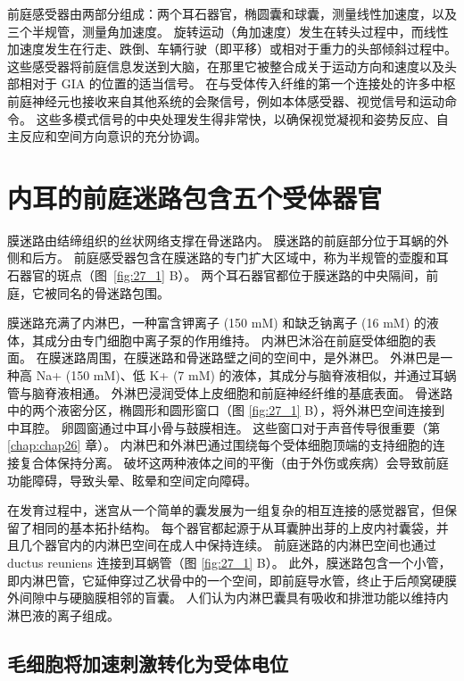 前庭感受器由两部分组成：两个耳石器官，椭圆囊和球囊，测量线性加速度，以及三个半规管，测量角加速度。
旋转运动（角加速度）发生在转头过程中，而线性加速度发生在行走、跌倒、车辆行驶（即平移）或相对于重力的头部倾斜过程中。
这些感受器将前庭信息发送到大脑，在那里它被整合成关于运动方向和速度以及头部相对于 GIA 的位置的适当信号。
在与受体传入纤维的第一个连接处的许多中枢前庭神经元也接收来自其他系统的会聚信号，例如本体感受器、视觉信号和运动命令。
这些多模式信号的中央处理发生得非常快，以确保视觉凝视和姿势反应、自主反应和空间方向意识的充分协调。



\section{内耳的前庭迷路包含五个受体器官}

膜迷路由结缔组织的丝状网络支撑在骨迷路内。
膜迷路的前庭部分位于耳蜗的外侧和后方。
前庭感受器包含在膜迷路的专门扩大区域中，称为半规管的壶腹和耳石器官的斑点（图~\ref{fig:27_1} B）。
两个耳石器官都位于膜迷路的中央隔间，前庭，它被同名的骨迷路包围。


膜迷路充满了内淋巴，一种富含钾离子 (150 mM) 和缺乏钠离子 (16 mM) 的液体，其成分由专门细胞中离子泵的作用维持。
内淋巴沐浴在前庭受体细胞的表面。
在膜迷路周围，在膜迷路和骨迷路壁之间的空间中，是外淋巴。
外淋巴是一种高 Na+ (150 mM)、低 K+ (7 mM) 的液体，其成分与脑脊液相似，并通过耳蜗管与脑脊液相通。
外淋巴浸润受体上皮细胞和前庭神经纤维的基底表面。 骨迷路中的两个液密分区，椭圆形和圆形窗口（图 \ref{fig:27_1} B），将外淋巴空间连接到中耳腔。 卵圆窗通过中耳小骨与鼓膜相连。
这些窗口对于声音传导很重要（第 \ref{chap:chap26} 章）。
内淋巴和外淋巴通过围绕每个受体细胞顶端的支持细胞的连接复合体保持分离。
破坏这两种液体之间的平衡（由于外伤或疾病）会导致前庭功能障碍，导致头晕、眩晕和空间定向障碍。


在发育过程中，迷宫从一个简单的囊发展为一组复杂的相互连接的感觉器官，但保留了相同的基本拓扑结构。
每个器官都起源于从耳囊肿出芽的上皮内衬囊袋，并且几个器官内的内淋巴空间在成人中保持连续。
前庭迷路的内淋巴空间也通过 ductus reuniens 连接到耳蜗管（图 \ref{fig:27_1} B）。
此外，膜迷路包含一个小管，即内淋巴管，它延伸穿过乙状骨中的一个空间，即前庭导水管，终止于后颅窝硬膜外间隙中与硬脑膜相邻的盲囊。
人们认为内淋巴囊具有吸收和排泄功能以维持内淋巴液的离子组成。


\subsection{毛细胞将加速刺激转化为受体电位}

